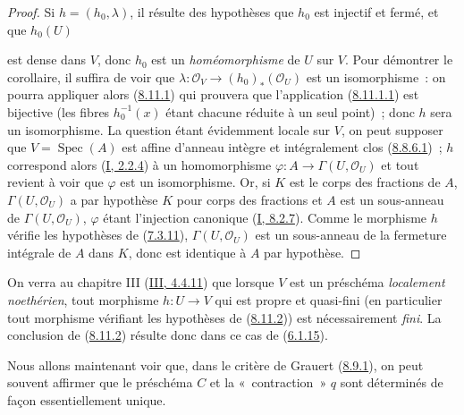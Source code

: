 \begin{proof}
Si $h=(h_0,\lambda)$, il résulte des hypothèses que $h_0$ est injectif et
fermé, et que $h_0(U)$

est dense dans $V$, donc $h_0$ est un \emph{homéomorphisme} de $U$ sur $V$.
Pour démontrer le corollaire, il suffira de voir que
$\lambda:\mathcal{O}_V\to(h_0)_*(\mathcal{O}_U)$ est un isomorphisme~: on
pourra appliquer alors (\hyperref[II.8.11.1-fr]{8.11.1}) qui prouvera que
l'application (\hyperref[II.8.11.1.1-fr]{8.11.1.1}) est bijective (les fibres
$h_0^{-1}(x)$ étant chacune réduite à un seul point)~; donc $h$ sera un
isomorphisme. La question étant évidemment locale sur $V$, on peut supposer
que $V=\operatorname{Spec}(A)$ est affine d'anneau intègre et intégralement
clos (\hyperref[II.8.8.6.1-fr]{8.8.6.1})~; $h$ correspond alors
(\hyperref[I.2.2.4-fr]{I, 2.2.4}) à un homomorphisme
$\varphi:A\to\Gamma(U,\mathcal{O}_U)$ et tout revient à voir que $\varphi$
est un isomorphisme. Or, si $K$ est le corps des fractions de $A$,
$\Gamma(U,\mathcal{O}_U)$ a par hypothèse $K$ pour corps des fractions et $A$
est un sous-anneau de $\Gamma(U,\mathcal{O}_U)$, $\varphi$ étant l'injection
canonique (\hyperref[I.8.2.7-fr]{I, 8.2.7}). Comme le morphisme $h$ vérifie
les hypothèses de (\hyperref[II.7.3.11-fr]{7.3.11}),
$\Gamma(U,\mathcal{O}_U)$ est un sous-anneau de la fermeture intégrale de $A$
dans $K$, donc est identique à $A$ par hypothèse.
\end{proof}

\begin{remark}[8.11.3]
\label{II.8.11.3-fr}
On verra au chapitre III (\hyperref[III.4.4.11-fr]{III, 4.4.11}) que lorsque
$V$ est un préschéma \emph{localement noethérien}, tout morphisme $h:U\to V$
qui est propre et quasi-fini (en particulier tout morphisme vérifiant les
hypothèses de (\hyperref[II.8.11.2-fr]{8.11.2})) est nécessairement
\emph{fini}. La conclusion de (\hyperref[II.8.11.2-fr]{8.11.2}) résulte donc
dans ce cas de (\hyperref[II.6.1.15-fr]{6.1.15}).
\end{remark}

\begin{env}[8.11.4]
\label{II.8.11.4-fr}
Nous allons maintenant voir que, dans le critère de Grauert
(\hyperref[II.8.9.1-fr]{8.9.1}), on peut souvent affirmer que le préschéma
$C$ et la «~contraction~» $q$ sont déterminés de façon essentiellement
unique.
\end{env}

